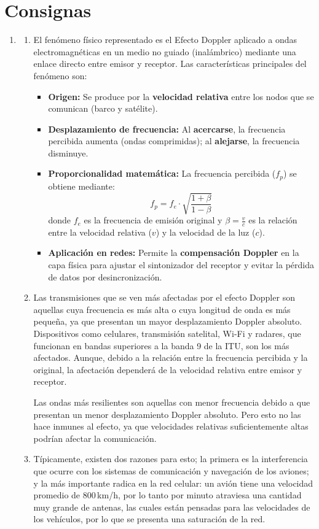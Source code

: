 \documentclass[11pt,a4paper]{article}
\begin{document}
\section{Consignas}
\begin{enumerate}[label=\arabic*)]
  \item
        \begin{enumerate}[label=\alph*)]
          \item
                El fenómeno físico representado es el Efecto Doppler aplicado a ondas electromagnéticas en un medio no guiado (inalámbrico) mediante una enlace directo entre emisor y receptor.
                Las características principales del fenómeno son:
                \begin{itemize}
                  \item \textbf{Origen:} Se produce por la \textbf{velocidad relativa} entre los nodos que se comunican (barco y satélite).
                  \item \textbf{Desplazamiento de frecuencia:} Al \textbf{acercarse}, la frecuencia percibida aumenta (ondas comprimidas); al \textbf{alejarse}, la frecuencia disminuye.
                  \item \textbf{Proporcionalidad matemática:} La frecuencia percibida ($f_p$) se obtiene mediante:
                        \[
                          f_p = f_e \cdot \sqrt{\frac{1+\beta}{1-\beta}}
                        \]
                        donde $f_e$ es la frecuencia de emisión original y $\beta = \frac{v}{c}$ es la relación entre la velocidad relativa ($v$) y la velocidad de la luz ($c$).
                  \item \textbf{Aplicación en redes:} Permite la \textbf{compensación Doppler} en la capa física para ajustar el sintonizador del receptor y evitar la pérdida de datos por desincronización.
                \end{itemize}
          \item
          Las transmisiones que se ven más afectadas por el efecto Doppler son aquellas cuya frecuencia es más alta o cuya longitud de onda es más pequeña, ya que presentan un mayor desplazamiento Doppler absoluto. Dispositivos como celulares, transmisión satelital, Wi-Fi y radares, que funcionan en bandas superiores a la banda 9 de la ITU, son los más afectados. Aunque, debido a la relación entre la frecuencia percibida y la original, la afectación dependerá de la velocidad relativa entre emisor y receptor.

          Las ondas más resilientes son aquellas con menor frecuencia debido a que presentan un menor desplazamiento Doppler absoluto. Pero esto no las hace inmunes al efecto, ya que velocidades relativas suficientemente altas podrían afectar la comunicación.
          \item
                Típicamente, existen dos razones para esto; la primera es la interferencia que ocurre con los sistemas de comunicación y navegación de los aviones; y la más importante radica en la red celular: un avión tiene una velocidad promedio de 800\,km/h, por lo tanto por minuto atraviesa una cantidad muy grande de antenas, las cuales están pensadas para las velocidades de los vehículos, por lo que se presenta una saturación de la red.


\end{enumerate}
\end{enumerate}
\end{document}
